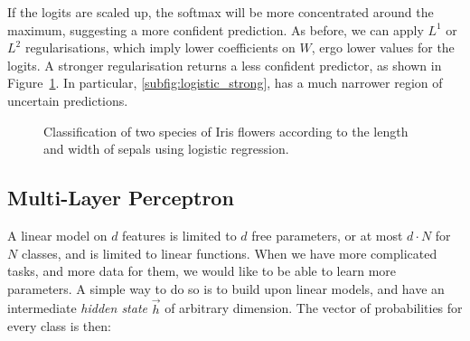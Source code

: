 If the logits are scaled up, the softmax will be more concentrated around the maximum, suggesting a more confident prediction.
As before, we can apply $L^1$ or $L^2$ regularisations, which imply lower coefficients on $W$, ergo lower values for the logits.
A stronger regularisation returns a less confident predictor, as shown in Figure~\ref{fig:logistic}.
In particular, \ref{subfig:logistic_strong}, has a much narrower region of uncertain predictions. 

\begin{figure}
	\centering
	\caption{Classification of two species of Iris flowers according to the length and width of sepals using logistic regression.}\label{fig:logistic}
\end{figure}


\subsection{Multi-Layer Perceptron}\label{sec:mlp}
A linear model on $d$ features is limited to $d$ free parameters, or at most $d \cdot N$ for $N$ classes, and is limited to linear functions.
When we have more complicated tasks, and more data for them, we would like to be able to learn more parameters.
A simple way to do so is to build upon linear models, and have an intermediate \emph{hidden state} $\vec{h}$ of arbitrary dimension.
The vector of probabilities for every class is then:


